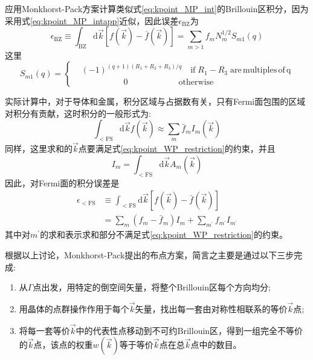 应用\textrm{Monkhorst-Pack}方案计算类似式\eqref{eq:kpoint_MP_int}的\textrm{Brillouin}区积分，因为采用式\eqref{eq:kpoint_MP_intapp}近似，因此误差$\epsilon_{\mathrm{BZ}}$为
\begin{equation}
	\epsilon_{\mathrm{BZ}}\equiv\int_{\mathrm{BZ}}\mathrm{d}\vec k[f(\vec k)-\bar f(\vec k)]=\sum_{m>1}f_mN_m^{1/2}S_{m1}(q)
	\label{eq:kpoint_MP_err}
\end{equation}
这里
	\begin{displaymath}
		S_{m1}(q)=\left\{
		\begin{aligned}
			&(-1)^{(q+1)(R_1+R_2+R_3)/q}\quad \mathrm{if}\; R_1-R_3\; \mathrm{are\, multiples\, of\, q} \\
			&\quad\qquad\qquad 0 \qquad\qquad\qquad \mathrm{otherwise}
		\end{aligned}
		\right.
	\end{displaymath}

实际计算中，对于导体和金属，积分区域与占据数有关，只有\textrm{Fermi}面包围的区域对积分有贡献，这时积分的一般形式为:~
	$$\int_{<\mathrm{FS}}\mathrm{d}\vec k f(\vec k)\approx\sum_m\bar f_mI_m(\vec k)$$
同样，这里求和的$\vec k$点要满足式\eqref{eq:kpoint_WP_restriction}的约束，并且
	$$I_m=\int_{<\mathrm{FS}}\mathrm{d}\vec k A_m(\vec k)$$
因此，对\textrm{Fermi}面的积分误差是
	\begin{displaymath}
		\begin{aligned}
			\epsilon_{<\mathrm{FS}}&\equiv\int_{<\mathrm{FS}}\mathrm{d}\vec k[f(\vec k)-\bar f(\vec k)]\\
			&=\sum_m(f_m-\bar f_m)I_m+\sum_{m^{\prime}}f_{m^{\prime}}I_{m^{\prime}}
		\end{aligned}
	\end{displaymath}
其中对$m^{\prime}$的求和表示求和部分不满足式\eqref{eq:kpoint_WP_restriction}的约束。



根据以上讨论，\textrm{Monkhorst-Pack}提出的布点方案，简言之主要是通过以下三步完成:~
\begin{enumerate}
	\item 从$\Gamma$点出发，用特定的倒空间矢量，将整个Brillouin区每个方向均分;
	\item 用晶体的点群操作作用于每个$\vec k$矢量，找出每一套由对称性相联系的等价$\vec k$点;
	\item 将每一套等价$\vec k$中的代表性点移动到不可约Brillouin区，得到一组完全不等价的$\vec k$点，该点的权重$w(\vec k)$等于等价$\vec k$点在总$\vec k$点中的数目。
\end{enumerate}

